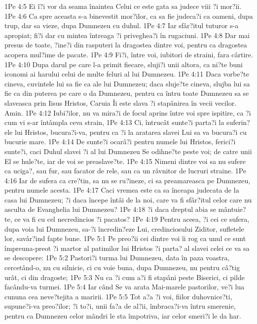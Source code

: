 1Pe 4:5  Ei î?i vor da seama înaintea Celui ce este gata sa judece viii ?i mor?ii.
1Pe 4:6  Ca spre aceasta s-a binevestit mor?ilor, ca sa fie judeca?i ca oameni, dupa trup, dar sa vieze, dupa Dumnezeu cu duhul.
1Pe 4:7  Iar sfâr?itul tuturor s-a apropiat; fi?i dar cu mintea întreaga ?i priveghea?i în rugaciuni.
1Pe 4:8  Dar mai presus de toate, ?ine?i din rasputeri la dragostea dintre voi, pentru ca dragostea acopera mul?ime de pacate.
1Pe 4:9  Fi?i, între voi, iubitori de straini, fara cârtire.
1Pe 4:10  Dupa darul pe care l-a primit fiecare, sluji?i unii altora, ca ni?te buni iconomi ai harului celui de multe feluri al lui Dumnezeu.
1Pe 4:11  Daca vorbe?te cineva, cuvintele lui sa fie ca ale lui Dumnezeu; daca sluje?te cineva, slujba lui sa fie ca din puterea pe care o da Dumnezeu, pentru ca întru toate Dumnezeu sa se slaveasca prin Iisus Hristos, Caruia Îi este slava ?i stapânirea în vecii vecilor. Amin.
1Pe 4:12  Iubi?ilor, nu va mira?i de focul aprins între voi spre ispitire, ca ?i cum vi s-ar întâmpla ceva strain,
1Pe 4:13  Ci, întrucât sunte?i parta?i la suferin?ele lui Hristos, bucura?i-va, pentru ca ?i la aratarea slavei Lui sa va bucura?i cu bucurie mare.
1Pe 4:14  De sunte?i ocarâ?i pentru numele lui Hristos, ferici?i sunte?i, caci Duhul slavei ?i al lui Dumnezeu Se odihne?te peste voi; de catre unii El se hule?te, iar de voi se preaslave?te.
1Pe 4:15  Nimeni dintre voi sa nu sufere ca uciga?, sau fur, sau facator de rele, sau ca un râvnitor de lucruri straine.
1Pe 4:16  Iar de sufera ca cre?tin, sa nu se ru?ineze, ci sa preamareasca pe Dumnezeu, pentru numele acesta.
1Pe 4:17  Caci vremea este ca sa înceapa judecata de la casa lui Dumnezeu; ?i daca începe întâi de la noi, care va fi sfâr?itul celor care nu asculta de Evanghelia lui Dumnezeu?
1Pe 4:18  ?i daca dreptul abia se mântuie?te, ce va fi cu cel necredincios ?i pacatos?
1Pe 4:19  Pentru aceea, ?i cei ce sufera, dupa voia lui Dumnezeu, sa-?i încredin?eze Lui, credinciosului Ziditor, sufletele lor, savâr?ind fapte bune.
1Pe 5:1  Pe preo?ii cei dintre voi îi rog ca unul ce sunt împreuna-preot ?i martor al patimilor lui Hristos ?i parta? al slavei celei ce va sa se descopere:
1Pe 5:2  Pastori?i turma lui Dumnezeu, data în paza voastra, cercetând-o, nu cu silnicie, ci cu voie buna, dupa Dumnezeu, nu pentru câ?tig urât, ci din dragoste;
1Pe 5:3  Nu ca ?i cum a?i fi stapâni peste Biserici, ci pilde facându-va turmei.
1Pe 5:4  Iar când Se va arata Mai-marele pastorilor, ve?i lua cununa cea neve?tejita a maririi.
1Pe 5:5  Tot a?a ?i voi, fiilor duhovnice?ti, supune?i-va preo?ilor; ?i to?i, unii fa?a de al?ii, îmbraca?i-va întru smerenie, pentru ca Dumnezeu celor mândri le sta împotriva, iar celor smeri?i le da har.
